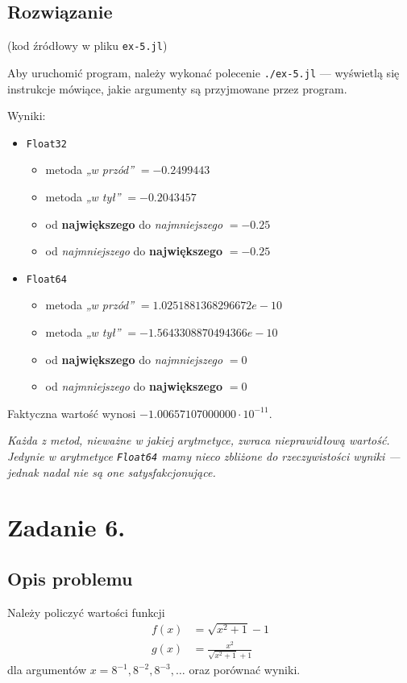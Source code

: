 \documentclass[10pt]{article}
\begin{document}
\subsection{Rozwiązanie}

(kod źródłowy w pliku \texttt{ex-5.jl})

Aby uruchomić program, należy wykonać polecenie \texttt{./ex-5.jl} — wyświetlą się instrukcje mówiące, jakie argumenty są przyjmowane przez program.

Wyniki:
\begin{itemize}
    \item \texttt{Float32}
    \begin{itemize}
        \item metoda \textit{„w przód”} $= -0.2499443$
        \item metoda \textit{„w tył”} $= -0.2043457$
        \item od \textbf{największego} do \textit{najmniejszego} $= -0.25$
        \item od \textit{najmniejszego} do \textbf{największego} $= -0.25$
    \end{itemize}
    \item \texttt{Float64}
    \begin{itemize}
        \item metoda \textit{„w przód”} $= 1.0251881368296672e-10$
        \item metoda \textit{„w tył”} $= -1.5643308870494366e-10$
        \item od \textbf{największego} do \textit{najmniejszego} $= 0$
        \item od \textit{najmniejszego} do \textbf{największego} $= 0$
    \end{itemize}
\end{itemize}

Faktyczna wartość wynosi $-1.00657107000000 \cdot 10^{-11}$.

\textit{Każda z metod, nieważne w jakiej arytmetyce, zwraca nieprawidłową wartość. Jedynie w arytmetyce \texttt{Float64} mamy nieco zbliżone do rzeczywistości wyniki — jednak nadal nie są one satysfakcjonujące.}

\section{Zadanie 6.}

\subsection{Opis problemu}
Należy policzyć wartości funkcji
$$
\begin{aligned}
    f(x) &= \sqrt{x^2 + 1} - 1\\
    g(x) &= \frac{x^2}{\sqrt{x^2 + 1} + 1}
\end{aligned}
$$
dla argumentów $x = 8^{-1}, 8^{-2}, 8^{-3}, \dots$ oraz porównać wyniki.
\end{document}
